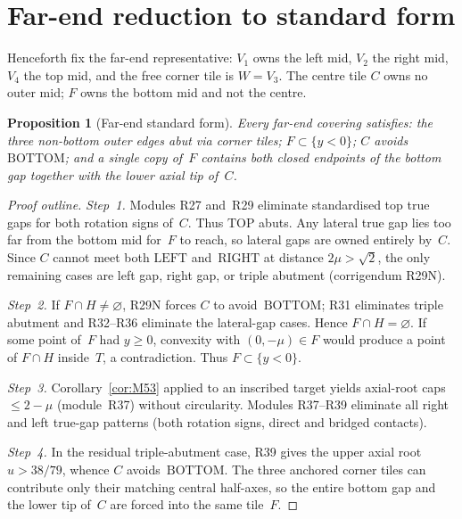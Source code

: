 \documentclass[11pt,reqno]{amsart}
\newtheorem{proposition}[theorem]{Proposition}
\theoremstyle{definition}
\newcommand{\BOTTOM}{\mathrm{BOTTOM}}
\newcommand{\RIGHT}{\mathrm{RIGHT}}
\newcommand{\TOP}{\mathrm{TOP}}
\newcommand{\LEFT}{\mathrm{LEFT}}
\begin{document}
\section{Far-end reduction to standard form}\label{sec:far}

Henceforth fix the far-end representative: $V_1$ owns the left mid, $V_2$ the
right mid, $V_4$ the top mid, and the free corner tile is $W=V_3$.  The centre
tile $C$ owns no outer mid; $F$ owns the bottom mid and not the centre.

\begin{proposition}[Far-end standard form]\label{prop:M71}
Every far-end covering satisfies: the three non-bottom outer edges abut via
corner tiles; $F\subset\{y<0\}$; $C$ avoids~$\BOTTOM$; and a single copy of~$F$
contains both closed endpoints of the bottom gap together with the lower axial
tip of~$C$.
\end{proposition}

\begin{proof}[Proof outline]
\emph{Step~1.} Modules R27 and~R29 eliminate standardised top true gaps for
both rotation signs of~$C$.  Thus $\TOP$ abuts.  Any lateral true gap lies too
far from the bottom mid for~$F$ to reach, so lateral gaps are owned entirely
by~$C$.  Since $C$ cannot meet both $\LEFT$ and~$\RIGHT$ at distance
$2\mu>\sqrt2$, the only remaining cases are left gap, right gap, or triple
abutment (corrigendum R29N).

\emph{Step~2.} If $F\cap H\neq\varnothing$, R29N forces $C$ to avoid~$\BOTTOM$;
R31 eliminates triple abutment and R32--R36 eliminate the lateral-gap cases.
Hence $F\cap H=\varnothing$.  If some point of~$F$ had $y\ge 0$, convexity with
$(0,-\mu)\in F$ would produce a point of $F\cap H$ inside~$T$, a contradiction.
Thus $F\subset\{y<0\}$.

\emph{Step~3.} Corollary~\ref{cor:M53} applied to an inscribed target yields
axial-root caps $\le 2-\mu$ (module~R37) without circularity.  Modules
R37--R39 eliminate all right and left true-gap patterns (both rotation signs,
direct and bridged contacts).

\emph{Step~4.} In the residual triple-abutment case, R39 gives the upper axial
root $u>38/79$, whence $C$ avoids~$\BOTTOM$.  The three anchored corner tiles
can contribute only their matching central half-axes, so the entire bottom gap
and the lower tip of~$C$ are forced into the same tile~$F$.
\end{proof}
\end{document}
